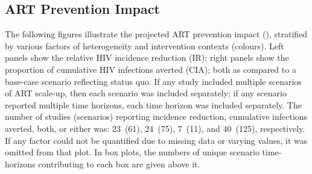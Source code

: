 \subsection{ART Prevention Impact}\label{app.sr.res.api}
The following figures illustrate the projected ART prevention impact (),
stratified by various factors of heterogeneity and intervention contexts (colours).
Left panels show the relative HIV incidence reduction (IR);
right panels show the proportion of cumulative HIV infections averted (CIA);
both as compared to a base-case scenario reflecting status quo.
If any study included multiple scenarios of ART scale-up,
then each scenario was included separately;
if any scenario reported multiple time horizons,
each time horizon was included separately.
The number of studies (scenarios) reporting
incidence reduction, cumulative infections averted, both, or either was:
23~(61), 24~(75), 7~(11), and 40~(125), respectively.
If any factor could not be quantified due to missing data or varying values,
it was omitted from that plot.
In box plots, the numbers of unique scenario time-horizons
contributing to each box are given above it.

